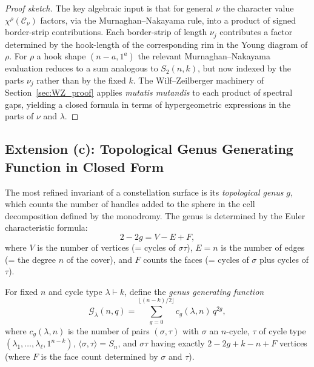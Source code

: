 \begin{proof}[Proof sketch]
The key algebraic input is that for general $\nu$ the character value
$\chi^\rho(\mathcal{C}_\nu)$ factors, via the Murnaghan–Nakayama rule, into
a product of signed border-strip contributions.  Each border-strip of length
$\nu_j$ contributes a factor determined by the hook-length of the
corresponding rim in the Young diagram of $\rho$.  For $\rho$ a hook shape
$(n-a,1^a)$ the relevant Murnaghan–Nakayama evaluation reduces to a sum
analogous to $S_2(n,k)$, but now indexed by the parts $\nu_j$ rather than by
the fixed $k$.  The Wilf–Zeilberger machinery of Section~\ref{sec:WZ_proof}
applies \emph{mutatis mutandis} to each product of spectral gaps, yielding a
closed formula in terms of hypergeometric expressions in the parts of $\nu$
and $\lambda$.
\end{proof}

\subsection{Extension (c): Topological Genus Generating Function in Closed Form}

The most refined invariant of a constellation surface is its
\emph{topological genus} $g$, which counts the number of handles added to the
sphere in the cell decomposition defined by the monodromy.  The genus is
determined by the Euler characteristic formula:
\begin{equation}\label{eq:euler}
  2-2g = V - E + F,
\end{equation}
where $V$ is the number of vertices (= cycles of $\sigma\tau$), $E=n$ is the
number of edges (= the degree $n$ of the cover), and $F$ counts the faces (=
cycles of $\sigma$ plus cycles of $\tau$).

\begin{definition}
For fixed $n$ and cycle type $\lambda\vdash k$, define the
\emph{genus generating function}
\begin{equation}\label{eq:GGF}
  \mathcal{G}_\lambda(n,q)
  = \sum_{g=0}^{\lfloor(n-k)/2\rfloor} c_g(\lambda,n)\,q^{2g},
\end{equation}
where $c_g(\lambda,n)$ is the number of pairs $(\sigma,\tau)$ with $\sigma$
an $n$-cycle, $\tau$ of cycle type $(\lambda_1,\ldots,\lambda_\ell,1^{n-k})$,
$\langle\sigma,\tau\rangle=S_n$, and $\sigma\tau$ having exactly $2-2g+k-n+F$
vertices (where $F$ is the face count determined by $\sigma$ and $\tau$).
\end{definition}

